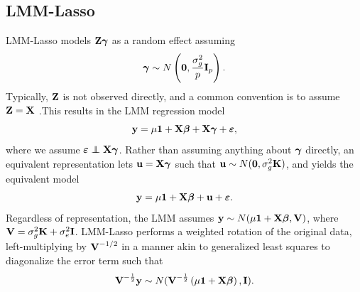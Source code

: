 \subsection{LMM-Lasso}



LMM-Lasso models $\textbf{Z}\boldsymbol{\gamma}$ as a random effect assuming 
$$\boldsymbol{\gamma} \sim N\left(\boldsymbol{0}, \frac{\sigma^2_g}{p} \textbf{I}_p \right).$$  Typically, $\textbf{Z}$ is not observed directly, and a common convention is to assume $\textbf{Z} = \textbf{X}$ \citep{wang2018multiplex, lippert2011fast, yang2014advantages}.This results in the LMM regression model
\begin{equation}
    \label{eqn:lmm_reg}
    \textbf{y} = \mu \textbf{1} + \textbf{X}\boldsymbol{\beta} + \textbf{X}\boldsymbol{\gamma}+ \boldsymbol{\varepsilon},
\end{equation}
where we assume $\beps \independent \bX\bgamma$. Rather than assuming anything about $\boldsymbol{\gamma}$ directly, an equivalent representation lets $\textbf{u}=\textbf{X}\boldsymbol{\gamma}$ such that $\textbf{u} \sim N(\boldsymbol{0}, \sigma^2_g \textbf{K})$, and yields the equivalent model
\begin{equation}
    \label{eqn:lmm_reg_u}
    \textbf{y} = \mu \textbf{1} + \textbf{X}\boldsymbol{\beta} + \textbf{u} + \boldsymbol{\varepsilon}.
\end{equation}
Regardless of representation, the LMM assumes $\textbf{y} \sim N(\mu \textbf{1} + \textbf{X} \boldsymbol{\beta}, \textbf{V})$, where $\textbf{V} = \sigma^2_g \textbf{K} + \sigma^2_e \textbf{I}$. LMM-Lasso performs a weighted rotation of the original data, left-multiplying by $\textbf{V}^{-1/2}$ in a manner akin to generalized least squares to diagonalize the error term such that
\begin{equation}
\textbf{V}^{-\frac{1}{2}}\textbf{y} \sim N(\textbf{V}^{-\frac{1}{2}} \left(\mu \textbf{1} +\textbf{X} \boldsymbol{\beta}\right), \textbf{I}).
\end{equation}

